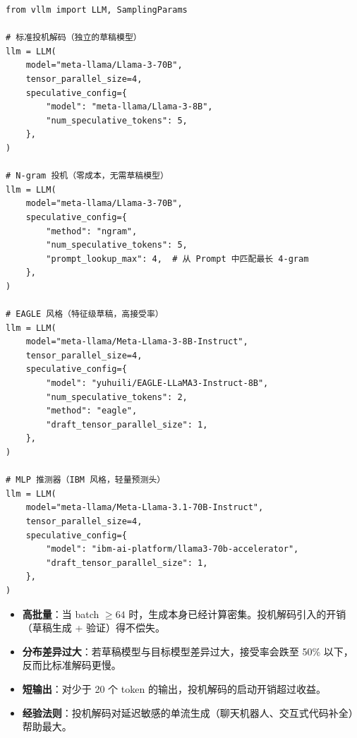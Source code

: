 \begin{lstlisting}[style=pythonstyle]
from vllm import LLM, SamplingParams

# 标准投机解码（独立的草稿模型）
llm = LLM(
    model="meta-llama/Llama-3-70B",
    tensor_parallel_size=4,
    speculative_config={
        "model": "meta-llama/Llama-3-8B",
        "num_speculative_tokens": 5,
    },
)

# N-gram 投机（零成本，无需草稿模型）
llm = LLM(
    model="meta-llama/Llama-3-70B",
    speculative_config={
        "method": "ngram",
        "num_speculative_tokens": 5,
        "prompt_lookup_max": 4,  # 从 Prompt 中匹配最长 4-gram
    },
)

# EAGLE 风格（特征级草稿，高接受率）
llm = LLM(
    model="meta-llama/Meta-Llama-3-8B-Instruct",
    tensor_parallel_size=4,
    speculative_config={
        "model": "yuhuili/EAGLE-LLaMA3-Instruct-8B",
        "num_speculative_tokens": 2,
        "method": "eagle",
        "draft_tensor_parallel_size": 1,
    },
)

# MLP 推测器（IBM 风格，轻量预测头）
llm = LLM(
    model="meta-llama/Meta-Llama-3.1-70B-Instruct",
    tensor_parallel_size=4,
    speculative_config={
        "model": "ibm-ai-platform/llama3-70b-accelerator",
        "draft_tensor_parallel_size": 1,
    },
)
\end{lstlisting}

\begin{warningbox}
\begin{itemize}
  \item \textbf{高批量}：当 batch $\geq 64$ 时，生成本身已经计算密集。投机解码引入的开销（草稿生成 + 验证）得不偿失。
  \item \textbf{分布差异过大}：若草稿模型与目标模型差异过大，接受率会跌至 50\% 以下，反而比标准解码更慢。
  \item \textbf{短输出}：对少于 20 个 token 的输出，投机解码的启动开销超过收益。
  \item \textbf{经验法则}：投机解码对延迟敏感的单流生成（聊天机器人、交互式代码补全）帮助最大。
\end{itemize}
\end{warningbox}

